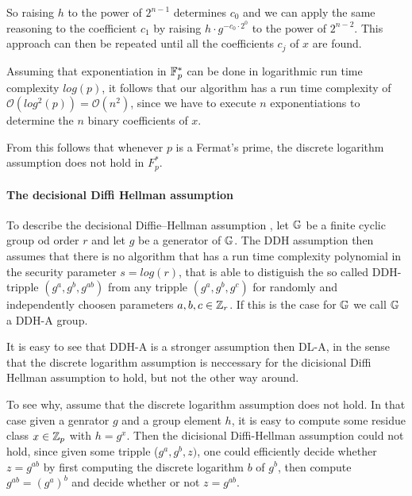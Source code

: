 \begin{example}
So raising $h$ to the power of $2^{n-1}$ determines $c_0$ and we can apply the same reasoning to the coefficient $c_1$ by raising $h\cdot g^{-c_0\cdot 2^0}$ to the power of $2^{n-2}$. This approach can then be repeated until all the coefficients $c_j$ of $x$ are found.

Assuming that exponentiation in $\mathbb{F}_p^*$ can be done in logarithmic run time complexity $log(p)$, it follows that our algorithm has a run time complexity of 
$\mathcal{O}(log^2(p))=\mathcal{O}(n^2)$, since we have to execute $n$ exponentiations to determine the $n$ binary coefficients of $x$. 

From this follows that whenever $p$ is a Fermat's prime, the discrete logarithm assumption does not hold in $F_p^*$.
\end{example}
\paragraph{The decisional Diffi Hellman assumption}
To describe the decisional Diffie–Hellman assumption , let $\mathbb{G}$ be a finite cyclic group od order $r$ and let $g$ be a generator of $\mathbb{G}$. The DDH assumption then assumes that there is no algorithm that has a run time complexity polynomial in the security parameter $s= log(r)$, that is able to distiguish the so called DDH-tripple $(g^a,g^b, g^{ab})$ from any tripple $(g^a,g^b,g^c)$ for randomly and independently choosen parameters $a,b,c\in \mathbb{Z}_r$. If this is the case for $\mathbb{G}$ we call $\mathbb{G}$ a DDH-A group.

It is easy to see that DDH-A is a stronger assumption then DL-A, in the sense that the discrete logarithm assumption is neccessary for the dicisional Diffi Hellman assumption to hold, but not the other way around. 

To see why, assume that the discrete logarithm assumption does not hold. In that case given a genrator $g$ and a group element $h$, it is easy to compute some residue class $x\in\mathbb{Z}_p$ with $h=g^x$. Then the dicisional Diffi-Hellman assumption could not hold, since given some tripple ($ g^a , g^b , z )$, one could efficiently decide whether $z = g^{ab}$ by first computing the discrete logarithm $b$ of  $g^b$, then compute $g^{ab}= (g^a)^b$ and decide whether or not $z=g^{ab}$.

